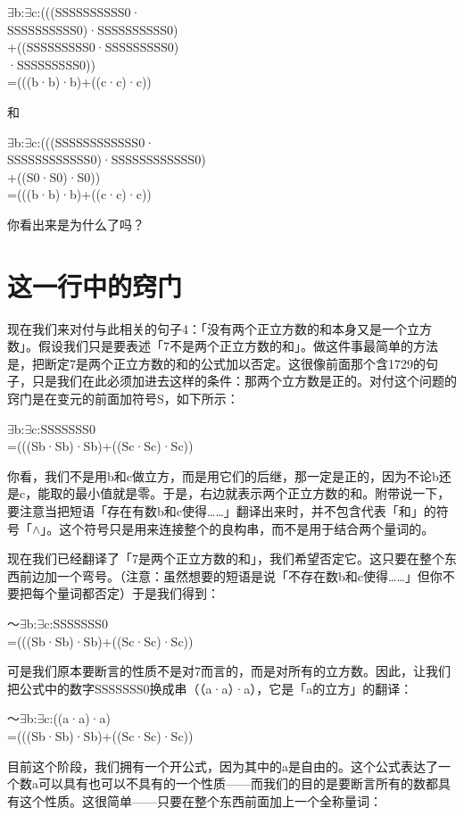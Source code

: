 \documentclass[
  12pt,
  twoside,
  openright,
  oldfontcommands,
]{memoir}
\begin{document}
$\exists$b:$\exists$c:(((SSSSSSSSSS0·\\
SSSSSSSSSS0)·SSSSSSSSSS0)\\
+((SSSSSSSSS0·SSSSSSSSS0)\\
·SSSSSSSSS0))\\
=(((b·b)·b)+((c·c)·c))

和

$\exists$b:$\exists$c:(((SSSSSSSSSSSS0·\\
SSSSSSSSSSSS0)·SSSSSSSSSSSS0)\\
+((S0·S0)·S0))\\
=(((b·b)·b)+((c·c)·c))

你看出来是为什么了吗？

\section{这一行中的窍门}

现在我们来对付与此相关的句子4：「没有两个正立方数的和本身又是一个立方数」。假设我们只是要表述「7不是两个正立方数的和」。做这件事最简单的方法是，把断定7是两个正立方数的和的公式加以否定。这很像前面那个含1729的句子，只是我们在此必须加进去这样的条件：那两个立方数是正的。对付这个问题的窍门是在变元的前面加符号S，如下所示：

$\exists$b:$\exists$c:SSSSSSS0\\
=(((Sb·Sb)·Sb)+((Sc·Sc)·Sc))

你看，我们不是用b和c做立方，而是用它们的后继，那一定是正的，因为不论b还是c，能取的最小值就是零。于是，右边就表示两个正立方数的和。附带说一下，要注意当把短语「存在有数b和c使得\ldots\ldots」翻译出来时，并不包含代表「和」的符号「$\wedge$」。这个符号只是用来连接整个的良构串，而不是用于结合两个量词的。

现在我们已经翻译了「7是两个正立方数的和」，我们希望否定它。这只要在整个东西前边加一个弯号。（注意：虽然想要的短语是说「不存在数b和c使得\ldots\ldots」但你不要把每个量词都否定）于是我们得到：

～$\exists$b:$\exists$c:SSSSSSS0\\
=(((Sb·Sb)·Sb)+((Sc·Sc)·Sc))

可是我们原本要断言的性质不是对7而言的，而是对所有的立方数。因此，让我们把公式中的数字SSSSSSS0换成串（（a·a）·a），它是「a的立方」的翻译：

～$\exists$b:$\exists$c:((a·a)·a)\\
=(((Sb·Sb)·Sb)+((Sc·Sc)·Sc))

目前这个阶段，我们拥有一个开公式，因为其中的a是自由的。这个公式表达了一个数a可以具有也可以不具有的一个性质------而我们的目的是要断言所有的数都具有这个性质。这很简单------只要在整个东西前面加上一个全称量词：
\end{document}
